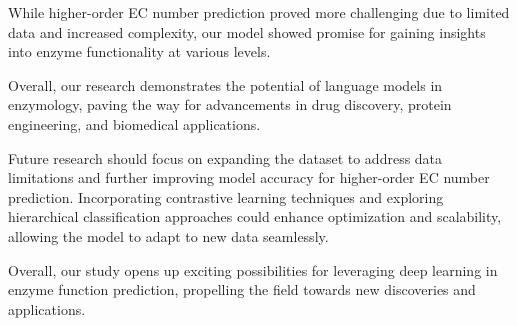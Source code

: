\documentclass[conference]{IEEEtran}
\begin{document}
While higher-order EC number prediction proved more challenging due to limited data and increased complexity, our model showed promise for gaining insights into enzyme functionality at various levels.

Overall, our research demonstrates the potential of language models in enzymology, paving the way for advancements in drug discovery, protein engineering, and biomedical applications.

Future research should focus on expanding the dataset to address data limitations and further improving model accuracy for higher-order EC number prediction. Incorporating contrastive learning techniques and exploring hierarchical classification approaches could enhance optimization and scalability, allowing the model to adapt to new data seamlessly.

Overall, our study opens up exciting possibilities for leveraging deep learning in enzyme function prediction, propelling the field towards new discoveries and applications.
\end{document}
